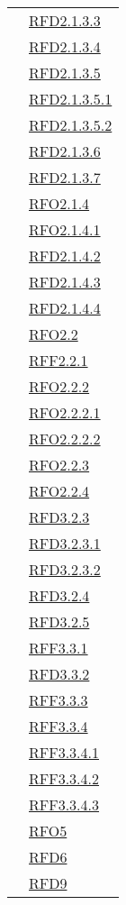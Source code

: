 \begin{longtable}{|>{\centering}m{5cm}|m{5cm}<{\centering}|}
& \hyperlink{RFD2.1.3.3}{RFD2.1.3.3}\\
& \hyperlink{RFD2.1.3.4}{RFD2.1.3.4}\\
& \hyperlink{RFD2.1.3.5}{RFD2.1.3.5}\\
& \hyperlink{RFD2.1.3.5.1}{RFD2.1.3.5.1}\\
& \hyperlink{RFD2.1.3.5.2}{RFD2.1.3.5.2}\\
& \hyperlink{RFD2.1.3.6}{RFD2.1.3.6}\\
& \hyperlink{RFD2.1.3.7}{RFD2.1.3.7}\\
& \hyperlink{RFO2.1.4}{RFO2.1.4}\\
& \hyperlink{RFO2.1.4.1}{RFO2.1.4.1}\\
& \hyperlink{RFD2.1.4.2}{RFD2.1.4.2}\\
& \hyperlink{RFD2.1.4.3}{RFD2.1.4.3}\\
& \hyperlink{RFD2.1.4.4}{RFD2.1.4.4}\\
& \hyperlink{RFO2.2}{RFO2.2}\\
& \hyperlink{RFF2.2.1}{RFF2.2.1}\\
& \hyperlink{RFO2.2.2}{RFO2.2.2}\\
& \hyperlink{RFO2.2.2.1}{RFO2.2.2.1}\\
& \hyperlink{RFO2.2.2.2}{RFO2.2.2.2}\\
& \hyperlink{RFO2.2.3}{RFO2.2.3}\\
& \hyperlink{RFO2.2.4}{RFO2.2.4}\\
& \hyperlink{RFD3.2.3}{RFD3.2.3}\\
& \hyperlink{RFD3.2.3.1}{RFD3.2.3.1}\\
& \hyperlink{RFD3.2.3.2}{RFD3.2.3.2}\\
& \hyperlink{RFD3.2.4}{RFD3.2.4}\\
& \hyperlink{RFD3.2.5}{RFD3.2.5}\\
& \hyperlink{RFF3.3.1}{RFF3.3.1}\\
& \hyperlink{RFD3.3.2}{RFD3.3.2}\\
& \hyperlink{RFF3.3.3}{RFF3.3.3}\\
& \hyperlink{RFF3.3.4}{RFF3.3.4}\\
& \hyperlink{RFF3.3.4.1}{RFF3.3.4.1}\\
& \hyperlink{RFF3.3.4.2}{RFF3.3.4.2}\\
& \hyperlink{RFF3.3.4.3}{RFF3.3.4.3}\\
& \hyperlink{RFO5}{RFO5}\\
& \hyperlink{RFD6}{RFD6}\\
& \hyperlink{RFD9}{RFD9}\\

\end{longtable}
